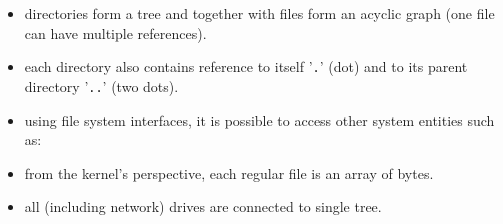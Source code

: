 
\begin{slide}
\setlength{\baselineskip}{0.8\baselineskip}
\begin{itemize}
\item directories form a tree and together with files form an acyclic graph
(one file can have multiple references).
\item each directory also contains reference to itself '\texttt{.}'
(dot) and to its parent directory '\texttt{..}' (two dots). 
\item using file system interfaces, it is possible to access other system
entities such as:
\item from the kernel's perspective, each regular file is an array of bytes.
\item all (including network) drives are connected to single tree.
\end{itemize}
\end{slide}

\label{DEVFS}

